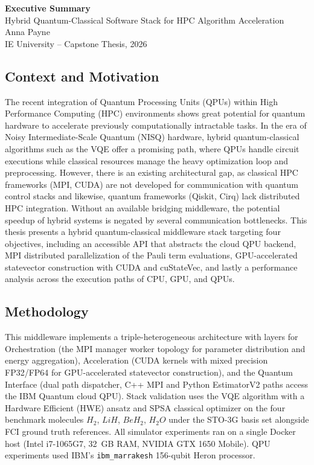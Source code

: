 \documentclass[12pt, letterpaper]{article}
\begin{document}
\begin{center}
    {\Large \textbf{Executive Summary}} \\[0.5em]
    {\large Hybrid Quantum-Classical Software Stack for HPC Algorithm Acceleration} \\[0.3em]
    {Anna Payne} \\[0.3em]
    {IE University -- Capstone Thesis, 2026}
\end{center}

\vspace{0.5em}

\subsection*{Context and Motivation}
The recent integration of Quantum Processing Units (QPUs) within High Performance Computing (HPC) environments
shows great potential for quantum hardware to accelerate previously computationally 
intractable tasks. In the era of Noisy Intermediate-Scale Quantum (NISQ) hardware, hybrid quantum-classical 
algorithms such as the VQE offer a promising path, where QPUs handle circuit executions while 
classical resources manage the heavy optimization loop and preprocessing. However, there is an existing architectural 
gap, as classical HPC frameworks (MPI, CUDA) are not developed for communication with quantum control 
stacks and likewise, quantum frameworks (Qiskit, Cirq) lack distributed HPC integration. Without an available bridging 
middleware, the potential speedup of hybrid systems is negated by several communication bottlenecks.
This thesis presents a hybrid quantum-classical middleware stack targeting four objectives, including  
an accessible API that abstracts the cloud QPU backend, 
MPI distributed parallelization of the Pauli term evaluations, 
GPU-accelerated statevector construction with CUDA and cuStateVec, and lastly 
a performance analysis across the execution paths of CPU, GPU, and QPUs.

\subsection*{Methodology}
This middleware implements a triple-heterogeneous architecture with layers for Orchestration (the MPI manager worker 
topology for parameter distribution and energy aggregation), Acceleration (CUDA kernels with 
mixed precision FP32/FP64 for GPU-accelerated statevector construction), and the Quantum Interface 
(dual path dispatcher, C++ MPI and Python EstimatorV2 paths access the IBM Quantum cloud QPU). 
Stack validation uses the VQE algorithm with a Hardware Efficient (HWE) ansatz and SPSA classical
optimizer on the four benchmark molecules $H_2$, $LiH$, $BeH_2$, $H_2O$ under the STO-3G basis set alongside 
FCI ground truth references. All simulator experiments ran on a single Docker host (Intel i7-1065G7, 
32~GB RAM, NVIDIA GTX 1650 Mobile). QPU experiments used IBM's \texttt{ibm\_marrakesh} 156-qubit Heron processor.
\end{document}
